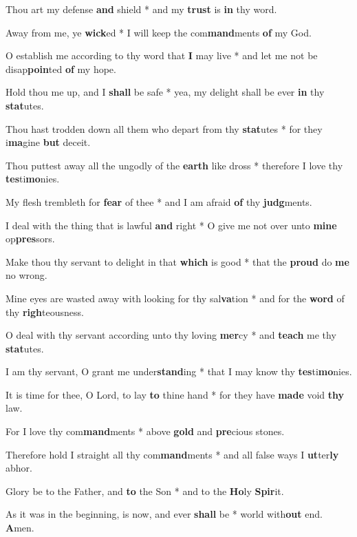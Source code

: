 \begin{multicols}{2}
	Thou art my defense \textbf{and} shield * and my \textbf{trust} is \textbf{in} thy word.
	
	Away from me, ye \textbf{wick}ed * I will keep the com\textbf{mand}ments \textbf{of} my God.
	
	O establish me according to thy word that \textbf{I} may live * and let me not be disap\textbf{poin}ted \textbf{of} my hope.
	
	Hold thou me up, and I \textbf{shall} be safe * yea, my delight shall be ever \textbf{in} thy \textbf{stat}utes.
	
	Thou hast trodden down all them who depart from thy \textbf{stat}utes * for they i\textbf{ma}gine \textbf{but} deceit.
	
	Thou puttest away all the ungodly of the \textbf{earth} like dross * therefore I love thy \textbf{tes}ti\textbf{mo}nies.
	
	My flesh trembleth for \textbf{fear} of thee * and I am afraid \textbf{of} thy \textbf{judg}ments.
	
	I deal with the thing that is lawful \textbf{and} right * O give me not over unto \textbf{mine} op\textbf{pres}sors.
	
	Make thou thy servant to delight in that \textbf{which} is good * that the \textbf{proud} do \textbf{me} no wrong.
	
	Mine eyes are wasted away with looking for thy sal\textbf{va}tion * and for the \textbf{word} of thy \textbf{righ}teousness.
	
	O deal with thy servant according unto thy loving \textbf{mer}cy * and \textbf{teach} me thy \textbf{stat}utes.
	
	I am thy servant, O grant me under\textbf{stand}ing * that I may know thy \textbf{tes}ti\textbf{mo}nies.
	
	It is time for thee, O Lord, to lay \textbf{to} thine hand * for they have \textbf{made} void \textbf{thy} law.
	
	For I love thy com\textbf{mand}ments * above \textbf{gold} and \textbf{pre}cious stones.
	
	Therefore hold I straight all thy com\textbf{mand}ments * and all false ways I \textbf{ut}ter\textbf{ly} abhor. 
	
	Glory be to the Father, and \textbf{to} the Son * and to the \textbf{Ho}ly \textbf{Spir}it.
	
	As it was in the beginning, is now, and ever \textbf{shall} be * world with\textbf{out} end. \textbf{A}men.
\end{multicols}
